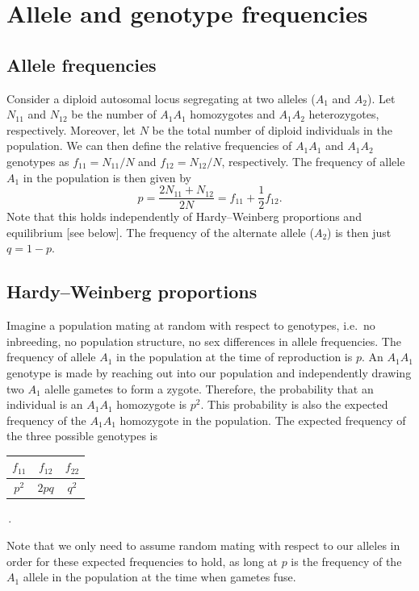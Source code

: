 \section{Allele and genotype frequencies}

\subsection{Allele frequencies}
Consider a diploid autosomal locus segregating at two alleles ($A_1$ and $A_2$). Let $N_{11}$ and $N_{12}$ be the number of $A_1A_1$ homozygotes and $A_1A_2$ heterozygotes, respectively. Moreover, let $N$ be the total number of diploid individuals in the population. We can then define the relative frequencies of $A_1A_1$ and $A_1A_2$ genotypes as $f_{11} = N_{11}/N$ and $f_{12} = N_{12}/N$, respectively. The frequency of allele $A_1$ in the population is then given by
\begin{equation}
p = \frac{2 N_{11} + N_{12}}{2N} = f_{11} + \frac{1}{2} f_{12}. %
\end{equation}
Note that this holds independently of Hardy--Weinberg proportions and equilibrium [see below]. The frequency of the alternate allele ($A_2$) is then just $q=1-p$.

\subsection{Hardy--Weinberg proportions}

Imagine a population mating at random with respect to genotypes, i.e.\
no inbreeding, no population structure, no sex differences in allele frequencies. The frequency of allele $A_1$ in the population at the time of reproduction is $p$. An $A_1A_1$ genotype is made by reaching out into our population and independently drawing two $A_1$ alelle gametes to form a zygote. Therefore, the probability that an individual is an $A_1A_1$ homozygote is $p^2$. This probability is also the expected frequency of the $A_1A_1$ homozygote in the population. The expected frequency of the three possible genotypes is
\begin{center}
\begin{tabular}{|ccc|}
\hline
$f_{11}$ & $f_{12}$ & $f_{22}$ \\
\hline
$p^2$ & $2pq$ & $q^2$ \\
\hline
\end{tabular}\,.
\end{center}
Note that we only need to assume random mating with
respect to our alleles in order for these expected frequencies to hold,
as long at $p$ is the frequency of the $A_1$ allele in the population at
the time when gametes fuse.


